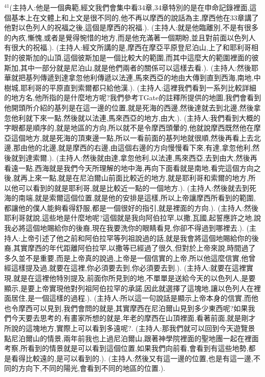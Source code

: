 \documentclass{book}
\begin{document}
$^{41}$(主持人:他是一個典範,經文我們會集中看34章,34章特別的是在申命記錄裡面,這個基本上在文體上和上文是很不同的,他不再以摩西的說話為主,摩西他在33章講了他對以色列人的祝福之後,這個是摩西的祝福.).
(主持人:就是他臨離別,不是有很多的內疚,慚愧,或者是覺得惋惜的地方,而是他充滿著一個期盼,並且對前面以色列人有很大的祝福.).
(主持人:經文所講的是,摩西在摩亞平原登尼泊山,上了和耶利哥相對的彼斯加的山頂,這個彼斯加是一個比較大的範圍,而其中這麼大的範圍裡面的彼斯加,其中一部分就是尼泊山,就是他們兩者的關係可以這樣去看.).
(主持人:然後耶華就把基列傳遞到達拿忽他利傳遞以法連,馬來西亞的地由大傳到直到西海,南地,中樹城,耶利哥的平原直到索爾都只給他漢.).
(主持人:這裡我們看到一系列比較詳細的地方名,他所指的是什麼地方呢?我們參考TGate的註釋所提供的地圖,我們會看到他開頭所介紹的基列是在這一邊的位置,就是死海的西邊,然後達就去到北邊,然後拿忽他利就下來一點,然後就以法連,馬來西亞的地方,由大.).
(主持人:我們看到大概的字眼都是順序的,就是地區的方向,所以就不是令摩西頭暈的,他就說摩西既然他在摩亞這個地方,就是死海的頂東邊一點,所以一看前面的基列地就很順,然後再看上去北邊,那由他的北邊,就是摩西的右邊,由這個右邊的方向慢慢看下來,有達,拿忽他利,然後就到達索爾.).
(主持人:然後就由達,拿忽他利,以法連,馬來西亞,去到由大,然後再看遠一點,西海就是我們今天所理解的地中海,再向下面看就是南地,看完這個方向之後,就再上來一點,就是在尼泊爾山前面比較近的地方,就是耶利哥和索爾的地方,所以他可以看到的就是耶利哥,就是比較近一點的一個地方.).
(主持人:然後就去到死海的南端,就是索爾這個位置,就是他的安排是這樣,所以上帝讓摩西所看到的範圍,都讓他的僕人能夠看得舒服,都是一個很好的指引,就是裡面的方向.).
(主持人:然後耶利哥就說,這些地是什麼地呢?這個就是我向阿伯拉罕,以撒,瓦國,起誓應許之地,說我必將這個地賜給你的後裔,現在我要洗你的眼睛看見,你卻不得過到哪裡去.).
(主持人:上帝引述了他之前和阿伯拉罕等列祖說過的話,就是我會將這個地賜給你的後裔,其實摩西的年代距離阿伯拉罕,以撒等已經過了很久,但對於上帝來說,時間過了多久並不是重要,而是上帝真的說過,上帝是一個信實的上帝,所以他這麼信實,他曾經這樣提及過,就要在這裡,你必須要去到,你必須要去到.).
(主持人:就要在這裡實現,就是在這裡他特別提及,前面你所見到的地,不單單是送給今天的以色列人,是要顯示,是要上帝實現他對列祖阿伯拉罕的承諾,因此就選擇了這塊地,讓以色列人在裡面居住,是一個這樣的過程.).
(主持人:所以這一句說話是顯示上帝本身的信實,而他也令摩西可以見到,我們會問的就是,其實摩西在尼泊爾山見到多少東西呢?如果我們今天要去思考的,有畫家所想的就是,年老的摩西在山頂裡面,看著前面,就是剛才所說的這塊地方,實際上可以看到多遠呢?.
(主持人:那我們就可以回到今天遊覽景點尼泊爾山的情景,兩年前我也上過尼泊爾山,跟著神學院裡面的聖地團一起在裡面考察,所看到的情景就是可以看到這個位置,如果我們向前看,會看到有這些地勢,都是看得比較遠的,是可以看到的.).
(主持人:然後又有這一邊的位置,也是有這一邊,不同的方向下,不同的陽光,會看到不同的地區的位置.).
\end{document}
